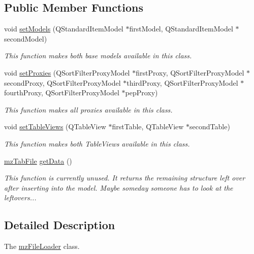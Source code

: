 \subsection*{Public Member Functions}
\begin{DoxyCompactItemize}
\item 
void \mbox{\hyperlink{classmz_file_loader_a699254cd8dabbf7fda70f02aa06730f7}{set\+Models}} (Q\+Standard\+Item\+Model $\ast$first\+Model, Q\+Standard\+Item\+Model $\ast$second\+Model)
\begin{DoxyCompactList}\small\item\em This function makes both base models available in this class. \end{DoxyCompactList}\item 
void \mbox{\hyperlink{classmz_file_loader_a515cf8ce62e8c7c235a62536e739cb9d}{set\+Proxies}} (Q\+Sort\+Filter\+Proxy\+Model $\ast$first\+Proxy, Q\+Sort\+Filter\+Proxy\+Model $\ast$second\+Proxy, Q\+Sort\+Filter\+Proxy\+Model $\ast$third\+Proxy, Q\+Sort\+Filter\+Proxy\+Model $\ast$fourth\+Proxy, Q\+Sort\+Filter\+Proxy\+Model $\ast$pep\+Proxy)
\begin{DoxyCompactList}\small\item\em This function makes all proxies available in this class. \end{DoxyCompactList}\item 
void \mbox{\hyperlink{classmz_file_loader_a92066953ae94c2cf1e58a2bf4a95c021}{set\+Table\+Views}} (Q\+Table\+View $\ast$first\+Table, Q\+Table\+View $\ast$second\+Table)
\begin{DoxyCompactList}\small\item\em This function makes both Table\+Views available in this class. \end{DoxyCompactList}\item 
\mbox{\hyperlink{structmz_tab_file}{mz\+Tab\+File}} \mbox{\hyperlink{classmz_file_loader_a495d5ddac38877451d24d974c25f7f11}{get\+Data}} ()
\begin{DoxyCompactList}\small\item\em This function is currently unused. It returns the remaining structure left over after inserting into the model. Maybe someday someone has to look at the leftovers... \end{DoxyCompactList}\end{DoxyCompactItemize}


\subsection{Detailed Description}
The \mbox{\hyperlink{classmz_file_loader}{mz\+File\+Loader}} class. 

